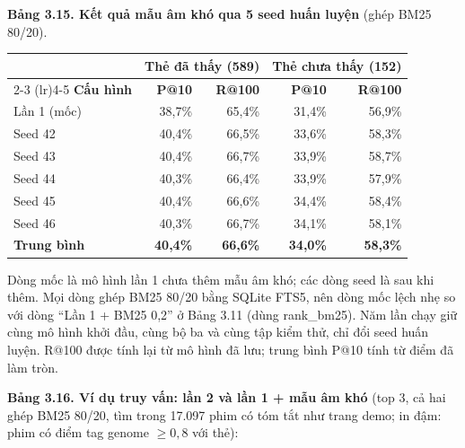 \documentclass[12pt,a4paper]{article}
\begin{document}
\textbf{Bảng 3.15. Kết quả mẫu âm khó qua 5 seed huấn luyện} (ghép BM25 80/20).
\begin{center}
\small
\begin{tabular}{lrrrr}
\toprule
& \multicolumn{2}{c}{\textbf{Thẻ đã thấy (589)}} & \multicolumn{2}{c}{\textbf{Thẻ chưa thấy (152)}} \\
\cmidrule(lr){2-3} \cmidrule(lr){4-5}
\textbf{Cấu hình} & \textbf{P@10} & \textbf{R@100} & \textbf{P@10} & \textbf{R@100} \\
\midrule
Lần 1 (mốc) & 38,7\% & 65,4\% & 31,4\% & 56,9\% \\
Seed 42 & 40,4\% & 66,5\% & 33,6\% & 58,3\% \\
Seed 43 & 40,4\% & 66,7\% & 33,9\% & 58,7\% \\
Seed 44 & 40,3\% & 66,4\% & 33,9\% & 57,9\% \\
Seed 45 & 40,4\% & 66,6\% & 34,4\% & 58,4\% \\
Seed 46 & 40,3\% & 66,7\% & 34,1\% & 58,1\% \\
\textbf{Trung bình} & \textbf{40,4\%} & \textbf{66,6\%} & \textbf{34,0\%} & \textbf{58,3\%} \\
\bottomrule
\end{tabular}
\end{center}
Dòng mốc là mô hình lần 1 chưa thêm mẫu âm khó; các dòng seed là sau khi thêm. Mọi dòng ghép BM25 80/20 bằng SQLite FTS5, nên dòng mốc lệch nhẹ so với dòng ``Lần 1 + BM25 0,2'' ở Bảng 3.11 (dùng rank\_bm25). Năm lần chạy giữ cùng mô hình khởi đầu, cùng bộ ba và cùng tập kiểm thử, chỉ đổi seed huấn luyện. R@100 được tính lại từ mô hình đã lưu; trung bình P@10 tính từ điểm đã làm tròn.

\textbf{Bảng 3.16. Ví dụ truy vấn: lần 2 và lần 1 + mẫu âm khó} (top 3, cả hai ghép BM25 80/20, tìm trong 17.097 phim có tóm tắt như trang demo; in đậm: phim có điểm tag genome $\ge 0{,}8$ với thẻ):
\end{document}
